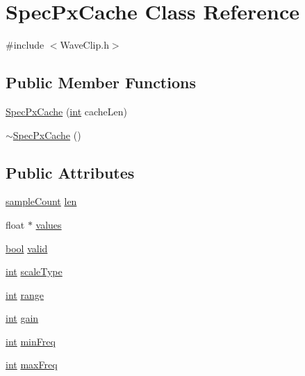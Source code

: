 \hypertarget{class_spec_px_cache}{}\section{Spec\+Px\+Cache Class Reference}
\label{class_spec_px_cache}


{\ttfamily \#include $<$Wave\+Clip.\+h$>$}

\subsection*{Public Member Functions}
\begin{DoxyCompactItemize}
\item 
\hyperlink{class_spec_px_cache_a175f166ec47b9e4a0b65d166f88055e2}{Spec\+Px\+Cache} (\hyperlink{xmltok_8h_a5a0d4a5641ce434f1d23533f2b2e6653}{int} cache\+Len)
\item 
\hyperlink{class_spec_px_cache_add592c3193be95a97a249c2162ecd567}{$\sim$\+Spec\+Px\+Cache} ()
\end{DoxyCompactItemize}
\subsection*{Public Attributes}
\begin{DoxyCompactItemize}
\item 
\hyperlink{include_2audacity_2_types_8h_afa427e1f521ea5ec12d054e8bd4d0f71}{sample\+Count} \hyperlink{class_spec_px_cache_a35dfc2e3b2a17e94fb4c77847a5356ce}{len}
\item 
float $\ast$ \hyperlink{class_spec_px_cache_a0c3a4884f54b874887d4051c1917a8e8}{values}
\item 
\hyperlink{mac_2config_2i386_2lib-src_2libsoxr_2soxr-config_8h_abb452686968e48b67397da5f97445f5b}{bool} \hyperlink{class_spec_px_cache_a31c71c0f3307a1a81f44aa35d16ec042}{valid}
\item 
\hyperlink{xmltok_8h_a5a0d4a5641ce434f1d23533f2b2e6653}{int} \hyperlink{class_spec_px_cache_a796e0079edd616e1651edd8a4b9aa212}{scale\+Type}
\item 
\hyperlink{xmltok_8h_a5a0d4a5641ce434f1d23533f2b2e6653}{int} \hyperlink{class_spec_px_cache_a96de1d4e8b6d77973de29c4b3584cfc4}{range}
\item 
\hyperlink{xmltok_8h_a5a0d4a5641ce434f1d23533f2b2e6653}{int} \hyperlink{class_spec_px_cache_a544e859e9069386b5558b24dd2a23c9d}{gain}
\item 
\hyperlink{xmltok_8h_a5a0d4a5641ce434f1d23533f2b2e6653}{int} \hyperlink{class_spec_px_cache_a7a9ac3b5030ffe0f6dc83821126108aa}{min\+Freq}
\item 
\hyperlink{xmltok_8h_a5a0d4a5641ce434f1d23533f2b2e6653}{int} \hyperlink{class_spec_px_cache_a2a248bbe2e6090efba5eee5678849a38}{max\+Freq}
\end{DoxyCompactItemize}


